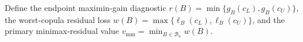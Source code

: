 Define the endpoint maximin-gain diagnostic \(r(B)=\min\{g_B(c_L),g_B(c_U)\}\), the worst-copula residual loss \(w(B)=\max\{\ell_B(c_L),\ell_B(c_U)\}\), and the primary minimax-residual value \(v_{\mathrm{mm}}=\min_{B\in\mathcal B_\kappa}w(B)\).